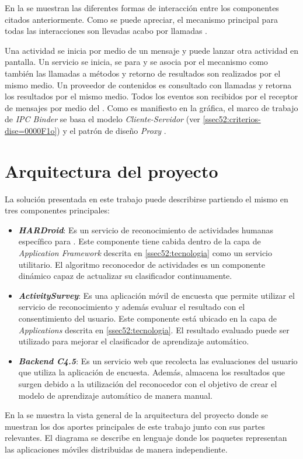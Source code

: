 En la  se muestran las diferentes formas
de interacción entre los componentes  citados anteriormente.
Como se puede apreciar, el mecanismo principal para todas las interacciones
son llevadas acabo por llamadas . 

Una actividad se inicia por medio de un mensaje y puede lanzar otra
actividad en pantalla. Un servicio se inicia, se para y se asocia
por el mecanismo  como también las llamadas a métodos y
retorno de resultados son realizados por el mismo medio. Un proveedor
de contenidos es consultado con llamadas  y retorna los
resultados por el mismo medio. Todos los eventos son recibidos por
el receptor de mensajes por medio del . Como es manifiesto
en la gráfica, el marco de trabajo de \emph{IPC Binder} se basa el
modelo \emph{Cliente-Servidor} (ver \ref{ssec52:criterios-dise=0000F1o})
y el patrón de diseño \emph{Proxy} \cite{Shalloway2004}.

\section{Arquitectura del proyecto}

\label{sec53:arquitectura}La solución presentada en este trabajo
puede describirse partiendo el mismo en tres componentes principales:
\begin{itemize}
\item \textbf{\emph{HARDroid}}: Es un servicio de reconocimiento de actividades
humanas específico para . Este componente tiene cabida
dentro de la capa de \emph{Application Framework} descrita en \ref{ssec52:tecnologia}
como un servicio utilitario. El algoritmo reconocedor de actividades
es un componente dinámico capaz de actualizar su clasificador continuamente.
\item \textbf{\emph{ActivitySurvey}}: Es una aplicación móvil de encuesta
que permite utilizar el servicio de reconocimiento y además evaluar
el resultado con el consentimiento del usuario. Este componente está
ubicado en la capa de \emph{Applications} descrita en \ref{ssec52:tecnologia}.
El resultado evaluado puede ser utilizado para mejorar el clasificador
de aprendizaje automático.
\item \textbf{\emph{Backend C4.5}}: Es un servicio web  que
recolecta las evaluaciones del usuario que utiliza la aplicación de
encuesta. Además, almacena los resultados que surgen debido a la utilización
del reconocedor con el objetivo de crear el modelo de aprendizaje
automático de manera manual. 
\end{itemize}
En la  se muestra la vista general de
la arquitectura del proyecto donde se muestran los dos aportes principales
de este trabajo junto con sus partes relevantes. El diagrama se describe
en lenguaje  donde los paquetes representan las aplicaciones
móviles distribuidas de manera independiente.

